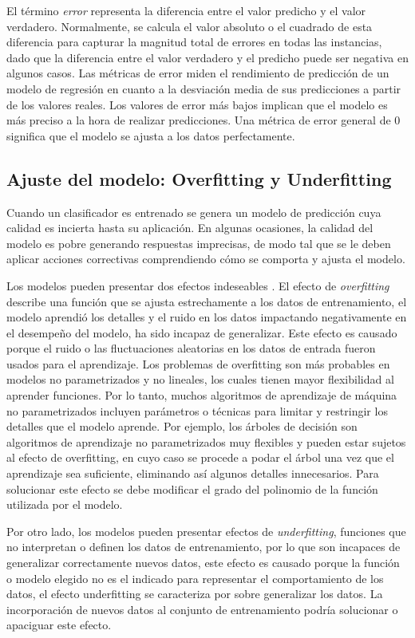 El término \emph{error }representa la diferencia entre el valor predicho
y el valor verdadero. Normalmente, se calcula el valor absoluto o
el cuadrado de esta diferencia para capturar la magnitud total de
errores en todas las instancias, dado que la diferencia entre el valor
verdadero y el predicho puede ser negativa en algunos casos. Las métricas
de error miden el rendimiento de predicción de un modelo de regresión
en cuanto a la desviación media de sus predicciones a partir de los
valores reales. Los valores de error más bajos implican que el modelo
es más preciso a la hora de realizar predicciones. Una métrica de
error general de 0 significa que el modelo se ajusta a los datos perfectamente.


\subsection{Ajuste del modelo: Overfitting y Underfitting\label{sub:Ajuste-del-modelo:}}

Cuando un clasificador es entrenado se genera un modelo de predicción
cuya calidad es incierta hasta su aplicación. En algunas ocasiones,
la calidad del modelo es pobre generando respuestas imprecisas, de
modo tal que se le deben aplicar acciones correctivas comprendiendo
cómo se comporta y ajusta el modelo. 

Los modelos pueden presentar dos efectos indeseables . El efecto de
\emph{overfitting }describe una función que se ajusta estrechamente
a los datos de entrenamiento, el modelo aprendió los detalles y el
ruido en los datos impactando negativamente en el desempeño del modelo,
ha sido incapaz de generalizar. Este efecto es causado porque el ruido
o las fluctuaciones aleatorias en los datos de entrada fueron usados
para el aprendizaje. Los problemas de overfitting son más probables
en modelos no parametrizados y no lineales, los cuales tienen mayor
flexibilidad al aprender funciones. Por lo tanto, muchos algoritmos
de aprendizaje de máquina no parametrizados incluyen parámetros o
técnicas para limitar y restringir los detalles que el modelo aprende.
Por ejemplo, los árboles de decisión son algoritmos de aprendizaje
no parametrizados muy flexibles y pueden estar sujetos al efecto de
overfitting, en cuyo caso se procede a podar el árbol una vez que
el aprendizaje sea suficiente, eliminando así algunos detalles innecesarios.
Para solucionar este efecto se debe modificar el grado del polinomio
de la función utilizada por el modelo. 

Por otro lado, los modelos pueden presentar efectos de \emph{underfitting},
funciones que no interpretan o definen los datos de entrenamiento,
por lo que son incapaces de generalizar correctamente nuevos datos,
este efecto es causado porque la función o modelo elegido no es el
indicado para representar el comportamiento de los datos, el efecto
underfitting se caracteriza por sobre generalizar los datos. La incorporación
de nuevos datos al conjunto de entrenamiento podría solucionar o apaciguar
este efecto. 

